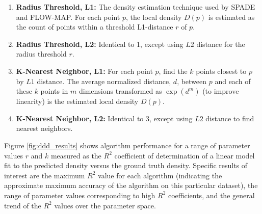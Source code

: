 \documentclass{article}
\begin{document}

\begin{enumerate}
\item \textbf{Radius Threshold, L1:} The density estimation technique used by SPADE and FLOW-MAP. For each point $p$, the local density $D(p)$ is estimated as the count of points within a threshold L1-distance $r$ of $p$. 

\item \textbf{Radius Threshold, L2:} Identical to 1, except using $L2$ distance for the radius threshold $r$. 

\item \textbf{K-Nearest Neighbor, L1:} For each point $p$, find the $k$ points closest to $p$ by $L1$ distance.  The average normalized distance, $d$, between $p$ and each of these $k$ points in $m$ dimensions transformed as $\exp(d^m)$ (to improve linearity) is the estimated local density $D(p)$. 

\item \textbf{K-Nearest Neighbor, L2:} Identical to 3, except using $L2$ distance to find nearest neighbors.


\end{enumerate}

Figure \ref{fig:ddd_results} shows algorithm performance for a range of parameter values $r$ and $k$ measured as the $R^2$ coefficient of determination of a linear model fit to the predicted density versus the ground truth density.   Specific results of interest are the maximum $R^2$ value for each algorithm (indicating the approximate maximum accuracy of the algorithm on this particular dataset), the range of parameter values corresponding to high $R^2$ coefficients, and the general trend of the $R^2$ values over the parameter space. 
\end{document}
